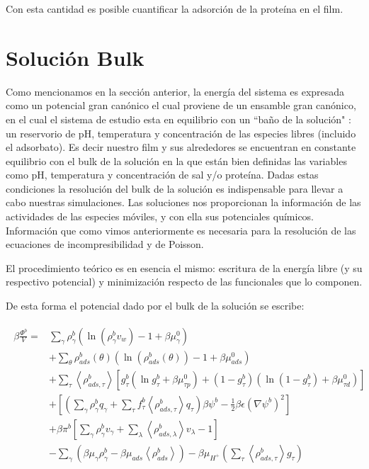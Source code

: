 Con esta cantidad es posible cuantificar la adsorci\'on de la prote\'ina en el film. 

\section{Soluci\'on Bulk}\label{sec:film:bulk-solution}

Como mencionamos en la secci\'on anterior, la energ\'ia del sistema es expresada como un potencial gran can\'onico el cual proviene de un ensamble gran can\'onico, en el cual el sistema de estudio  esta en equilibrio con un ``ba\~no de  la soluci\'on" :  un reservorio de pH, temperatura y concentraci\'on de las especies libres (incluido el adsorbato). Es decir  nuestro film y sus alrededores se encuentran en constante equilibrio con el bulk de la soluci\'on en la que est\'an bien definidas las variables como pH, temperatura y concentraci\'on de sal y/o prote\'ina. 
Dadas estas condiciones la resoluci\'on del bulk de la soluci\'on es indispensable para llevar a cabo nuestras simulaciones. Las soluciones nos proporcionan la informaci\'on de las actividades de las especies m\'oviles, y con ella sus potenciales qu\'imicos. Informaci\'on que como vimos anteriormente es necesaria para la resoluci\'on de las ecuaciones de incompresibilidad y de Poisson.

El procedimiento te\'orico es en esencia el mismo: escritura de la energ\'ia libre (y su respectivo potencial) y minimizaci\'on respecto de las funcionales  que lo componen.

De esta forma el potencial dado por el bulk de la soluci\'on se escribe:

\begin{align}
	\begin{aligned}
		\beta\frac{ \Phi^b}{V}=  & \sum_{\gamma}{\rho^b_\gamma\left(\ln \left(\rho^b_\gamma v_w\right) -1 + \beta\mu^0_\gamma\right)} \\
		&+ \sum_{\theta}{\rho^b_{ads}(\theta)\left(\ln \left(\rho^b_{ads}(\theta)\right) -1 + \beta\mu^0_{ads} \right)} \\
		& + \sum_\tau \left<\rho^b_{ads,\tau}\right> \left[g^b_\tau(\ln g^b_\tau+ \beta\mu^0_{\tau p}) +(1-g^b_\tau)(\ln (1-g^b_\tau)+\beta\mu^0_{\tau d})\right]   \\
		& +\left[\left(\sum_{\gamma } {\rho^b_\gamma q_\gamma + \sum_\tau{f^b_\tau \left<\rho^b_{ads,\tau}\right> q_\tau} }\right)\beta\psi^b -\frac{1}{2}\beta\epsilon(\nabla\psi^b)^2 \right] \\ 
		& +\beta\pi^b{\left[\sum_{\gamma}\rho^b_\gamma v_\gamma + \sum_\lambda{\left<\rho^b_{ads,\lambda}\right>v_\lambda}  -1 \right]} \\
		&   -\sum_\gamma \left(\beta \mu_\gamma \rho^b_\gamma - \beta \mu_{ads} \left<\rho^b_{ads}\right> \right)   -\beta\mu_{H^+} \left( \sum_\tau\left< \rho^b_{ads,\tau} \right>g_\tau  \right )
	\end{aligned}
	\label{eq:film:pot-bulk}
\end{align}


